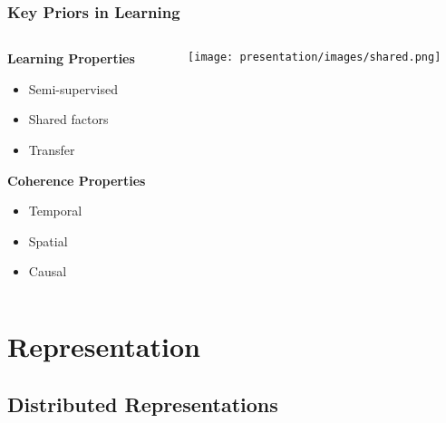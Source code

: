 \documentclass{beamer}
\begin{document}
\begin{frame}[fragile]
\frametitle{Key Priors in Learning}
\begin{columns}
    \begin{column}{0.4\textwidth}
        \textbf{Learning Properties}
        \begin{itemize}
        \item Semi-supervised
        \item Shared factors
        \item Transfer
        \end{itemize}
        \pause

        \vspace{0.2cm}
        
        \textbf{Coherence Properties}
        \begin{itemize}
        \item Temporal
        \item Spatial
        \item Causal
        \end{itemize}
    \end{column}
    \pause

    \begin{column}{0.6\textwidth}
        \texttt{[image: presentation/images/shared.png]}
    \end{column}
\end{columns}
\end{frame}

\section{Representation}

\subsection{Distributed Representations}
\end{document}
